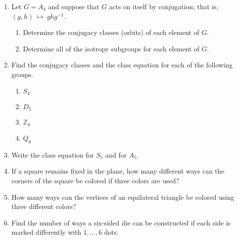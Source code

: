 {\begin{enumerate}
\begin{enumerate}
 \item
Describe geometrically the orbit containing $P$.
 
 \item
Find the group $G_P$.
 
\end{enumerate}
 
 
\item
Let $G =  A_4$ and suppose that $G$ acts on itself by conjugation;
that is, $(g,h)~\mapsto~ghg^{-1}$. 
\begin{enumerate}
 
 \item
Determine the conjugacy classes (orbits) of each element of $G$.
 
 \item
Determine all of the isotropy subgroups for each element of $G$.
 
\end{enumerate}
 
 
\item
Find the conjugacy classes and the class equation for each of the
following groups. 
\begin{multicols}{2}
\begin{enumerate}

\item
$S_4$

\item
$D_5$

\item
${\mathbb Z}_9$

\item
$Q_8$


\end{enumerate}
\end{multicols}
 

 
 
\item  %
Write the class equation for $S_5$ and for $A_5$.
 
 
\item
If a square remains fixed in the plane, how many different ways can
the corners of the square be colored if three colors are used?
 
 
\item
How many ways can the vertices of an equilateral triangle be colored
using three different colors? 
 
 
\item
Find the number of ways a six-sided die can be constructed if each
side is  marked differently with $1, \ldots, 6$ 
dots.
 

\end{enumerate}}
